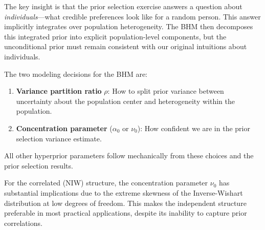 \documentclass[11pt]{article}
\begin{document}
The key insight is that the prior selection exercise answers a question about \textit{individuals}---what credible preferences look like for a random person. This answer implicitly integrates over population heterogeneity. The BHM then decomposes this integrated prior into explicit population-level components, but the unconditional prior must remain consistent with our original intuitions about individuals.

The two modeling decisions for the BHM are:
\begin{enumerate}
  \item \textbf{Variance partition ratio} $\rho$: How to split prior variance between uncertainty about the population center and heterogeneity within the population.
  \item \textbf{Concentration parameter} ($\alpha_0$ or $\nu_0$): How confident we are in the prior selection variance estimate.
\end{enumerate}

All other hyperprior parameters follow mechanically from these choices and the prior selection results.

For the correlated (NIW) structure, the concentration parameter $\nu_0$ has substantial implications due to the extreme skewness of the Inverse-Wishart distribution at low degrees of freedom. This makes the independent structure preferable in most practical applications, despite its inability to capture prior correlations.
\end{document}
